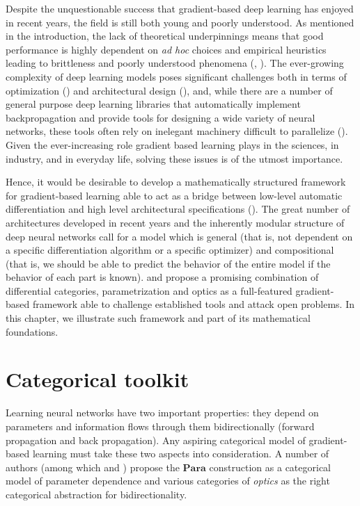 \documentclass[11pt,a4paper,openright,twoside]{report}
\theoremstyle{plain}
\theoremstyle{definition}
\begin{document}
Despite the unquestionable success that gradient-based deep learning has enjoyed in recent years, the field is still both young and poorly understood. As mentioned in the introduction, the lack of theoretical underpinnings means that good performance is highly dependent on \textit{ad hoc} choices and empirical heuristics leading to brittleness and poorly understood phenomena (\cite{shiebler2021category}, \cite{gavranovic2024fundamental}). The ever-growing complexity of deep learning models poses significant challenges both in terms of optimization (\cite{elliott2018simple}) and architectural design (\cite{gavranovicposition}), and, while there are a number of general purpose deep learning libraries that automatically implement backpropagation and provide tools for designing a wide variety of neural networks, these tools often rely on inelegant machinery difficult to parallelize (\cite{elliott2018simple}). Given the ever-increasing role gradient based learning plays in the sciences, in industry, and in everyday life, solving these issues is of the utmost importance. 

Hence, it would be desirable to develop a mathematically structured framework for gradient-based learning able to act as a bridge between low-level automatic differentiation and high level architectural specifications (\cite{gavranovic2024fundamental}). The great number of architectures developed in recent years and the inherently modular structure of deep neural networks call for a model which is general (that is, not dependent on a specific differentiation algorithm or a specific optimizer) and compositional (that is, we should be able to predict the behavior of the entire model if the behavior of each part is known). \cite{cruttwell2022categorical} and \cite{gavranovic2024fundamental} propose a promising combination of differential categories, parametrization and optics as a full-featured gradient-based framework able to challenge established tools and attack open problems. In this chapter, we illustrate such framework  and part of its mathematical foundations. 

\section{Categorical toolkit}

Learning neural networks have two important properties: they depend on parameters and information flows through them bidirectionally (forward propagation and back propagation). Any aspiring categorical model of gradient-based learning must take these two aspects into consideration. A number of authors (among which \cite{cruttwell2022categorical} and \cite{gavranovic2024fundamental}) propose the $\mathbf{Para}$ construction as a categorical model of parameter dependence and various categories of \textit{optics} as the right categorical abstraction for bidirectionality.
\end{document}
